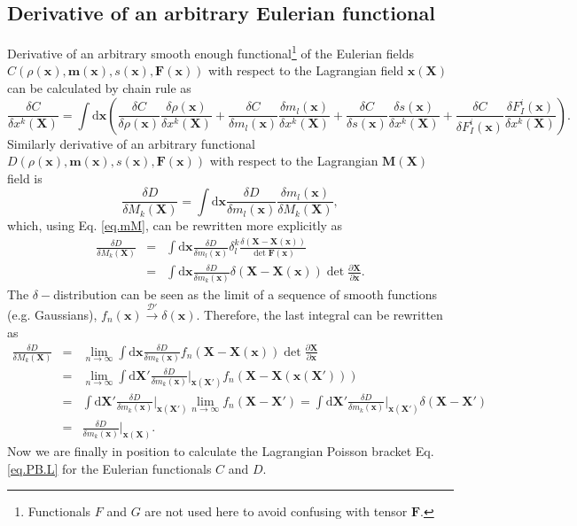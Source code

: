 \documentclass[
10pt, %
a4paper, %
oneside, %
headinclude,footinclude, %
BCOR5mm, %
]{scrartcl}
\newcommand{\xx}{\mathbf{x}}
\newcommand{\XX}{\mathbf{X}}
\newcommand{\dX}{\mathrm{d}\XX}
\newcommand{\dx}{\mathrm{d}\xx}
\newcommand{\mm}{\mathbf{m}}
\newcommand{\MM}{\mathbf{M}}
\newcommand{\FF}{\mathbf{F}}
\begin{document}
\subsection{Derivative of an arbitrary Eulerian functional}
Derivative of an arbitrary smooth enough functional\footnote{Functionals $F$ and $G$ are not used here to avoid confusing with tensor $\FF$.} of the Eulerian fields $C(\rho(\xx), \mm(\xx), s(\xx), \FF(\xx))$ with respect to the Lagrangian field $\xx(\XX)$ can be calculated by chain rule as
\begin{equation}\label{eq.Cx}
	\frac{\delta C}{\delta x^k(\XX)} = \int\dx \left(\frac{\delta C}{\delta \rho(\xx)}\frac{\delta \rho(\xx)}{\delta x^k(\XX)}
	+\frac{\delta C}{\delta m_l(\xx)}\frac{\delta m_l(\xx)}{\delta x^k(\XX)}
	+\frac{\delta C}{\delta s(\xx)}\frac{\delta s(\xx)}{\delta x^k(\XX)}
	+\frac{\delta C}{\delta F^i_I(\xx)}\frac{\delta F^i_I(\xx)}{\delta x^k(\XX)}\right).
\end{equation}
Similarly derivative of an arbitrary functional $D(\rho(\xx), \mm(\xx), s(\xx), \FF(\xx))$ with respect to the Lagrangian $\MM(\XX)$ field is
\begin{equation}
	\frac{\delta D}{\delta M_k(\XX)} = \int\dx \frac{\delta D}{\delta m_l(\xx)}\frac{\delta m_l(\xx)}{\delta M_k(\XX)},
\end{equation}
which, using Eq. \eqref{eq.mM}, can be rewritten more explicitly as
\begin{eqnarray}
	\frac{\delta D}{\delta M_k(\XX)} &=& \int\dx \frac{\delta D}{\delta m_l(\xx)}\delta^k_l \frac{\delta(\XX-\XX(\xx))}{\det\FF(\xx)}\nonumber\\
	&=& \int\dx \frac{\delta D}{\delta m_k(\xx)}\delta(\XX-\XX(\xx))\det\frac{\partial \XX}{\partial \xx}.
\end{eqnarray}
The $\delta-$distribution can be seen as the limit of a sequence of smooth functions (e.g. Gaussians), $f_n(\xx)\stackrel{\mathcal{D}'}{\to}\delta(\xx)$. Therefore, the last integral can be rewritten as
\begin{eqnarray}
	\frac{\delta D}{\delta M_k(\XX)} &=& \lim_{n\to\infty}\int\dx \frac{\delta D}{\delta m_k(\xx)}f_n(\XX-\XX(\xx)) \det\frac{\partial \XX}{\partial \xx}\nonumber\\
	&=& \lim_{n\to\infty}\int\dX' \frac{\delta D}{\delta m_k(\xx)}\Big|_{\xx(\XX')} f_n(\XX-\XX(\xx(\XX'))) \nonumber\\
	&=& \int\dX' \frac{\delta D}{\delta m_k(\xx)}\Big|_{\xx(\XX')} \lim_{n\to\infty}f_n(\XX-\XX') 
	= \int\dX' \frac{\delta D}{\delta m_k(\xx)}\Big|_{\xx(\XX')} \delta(\XX-\XX') \nonumber\\
	&=&\frac{\delta D}{\delta m_k(\xx)}\Big|_{\xx(\XX)}.
\end{eqnarray}
Now we are finally in position to calculate the Lagrangian Poisson bracket Eq. \eqref{eq.PB.L} for the Eulerian functionals $C$ and $D$. 
\end{document}
